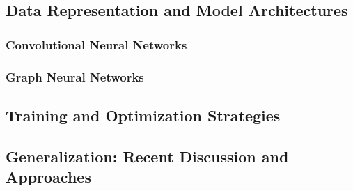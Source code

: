 
    \subsection{Data Representation and Model Architectures} %

        \subsubsection{Convolutional Neural Networks}
        \subsubsection{Graph Neural Networks}

    \subsection{Training and Optimization Strategies} %

    \subsection{Generalization: Recent Discussion and Approaches} %
